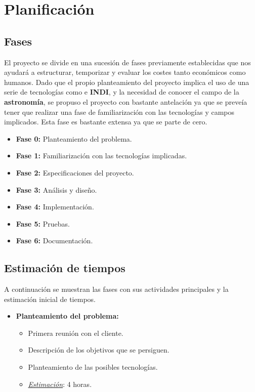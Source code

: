 \chapter{Planificación}

\section{Fases}

El proyecto se divide en una sucesión de fases previamente establecidas que nos ayudará a estructurar, temporizar y evaluar los costes tanto económicos como humanos. Dado que el propio planteamiento del proyecto implica el uso de una serie de tecnologías como  e \textbf{INDI}, y la necesidad de conocer el campo de la \textbf{astronomía}, se propuso el proyecto con bastante antelación ya que se preveía tener que realizar una fase de familiarización con las tecnologías y campos implicados. Esta fase es bastante extensa ya que se parte de cero.

\begin{itemize}
  \item \textbf{Fase 0:} Planteamiento del problema.
  \item \textbf{Fase 1:} Familiarización con las tecnologías implicadas.
  \item \textbf{Fase 2:} Especificaciones del proyecto.
  \item \textbf{Fase 3:} Análisis y diseño.
  \item \textbf{Fase 4:} Implementación.
  \item \textbf{Fase 5:} Pruebas.
  \item \textbf{Fase 6:} Documentación.
\end{itemize}

\newpage
\section{Estimación de tiempos}

A continuación se muestran las fases con sus actividades principales y la estimación inicial de tiempos.

\begin{itemize}
   \item \textbf{Planteamiento del problema:}
   \begin{itemize}
    \item Primera reunión con el cliente.
    \item Descripción de los objetivos que se persiguen.
    \item Planteamiento de las posibles tecnologías.
    \item \underline{\textit{Estimación}}: 4 horas.
    \end{itemize}
\end{itemize}

